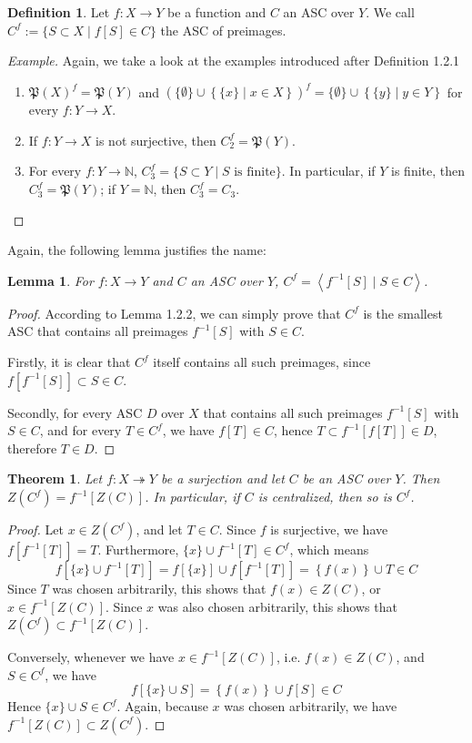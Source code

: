\documentclass{article}
\newtheorem{theorem}{Theorem}[subsection]
\newtheorem{lemma}{Lemma}[subsection]
\theoremstyle{remark}
\theoremstyle{definition}
\newtheorem{definition}{Definition}[subsection]
\newcommand{\N}{\mathbb N}
\newcommand{\p}{\mathfrak P}
\newenvironment{example}{\begin{proof}[Example]}{\end{proof}}
\begin{document}
	\begin{definition}
		Let $f:X\to Y$ be a function and $C$ an ASC over $Y$. We call $C^f:=\{S\subset X\mid f[S]\in C\}$ the ASC of preimages.
	\end{definition}
	\begin{example}
		Again, we take a look at the examples introduced after Definition 1.2.1
		\begin{enumerate}
			\item $\p(X)^f=\p(Y)$ and $\left(\{\emptyset\}\cup\left\{\{x\}\mid x\in X\right\}\right)^f=\{\emptyset\}\cup\left\{\{y\}\mid y\in Y\right\}$ for every $f:Y\to X$.
			\item If $f:Y\to X$ is not surjective, then $C_2^f=\p(Y)$.
			\item For every $f:Y\to\N$, $C_3^f=\{S\subset Y\mid S\text{ is finite}\}$. In particular, if $Y$ is finite, then $C_3^f=\p(Y)$; if $Y=\N$, then $C_3^f=C_3$.
		\end{enumerate}
	\end{example}
	Again, the following lemma justifies the name:
	\begin{lemma}
		For $f:X\to Y$ and $C$ an ASC over $Y$, $C^f=\left\langle f^{-1}[S]\mid S\in C\right\rangle$.
	\end{lemma}
	\begin{proof}
		According to Lemma 1.2.2, we can simply prove that $C^f$ is the smallest ASC that contains all preimages $f^{-1}[S]$ with $S\in C$.
		
		Firstly, it is clear that $C^f$ itself contains all such preimages, since $f\left[f^{-1}[S]\right]\subset S\in C$.
		
		Secondly, for every ASC $D$ over $X$ that contains all such preimages $f^{-1}[S]$ with $S\in C$, and for every $T\in C^f$, we have $f[T]\in C$, hence $T\subset f^{-1}\left[f[T]\right]\in D$, therefore $T\in D$.
	\end{proof}
	\begin{theorem}
		Let $f:X\twoheadrightarrow Y$ be a surjection and let $C$ be an ASC over $Y$. Then $Z\left(C^f\right)=f^{-1}\left[Z(C)\right]$. In particular, if $C$ is centralized, then so is $C^f$.
	\end{theorem}
	\begin{proof}
		Let $x\in Z\left(C^f\right)$, and let $T\in C$. Since $f$ is surjective, we have $f\left[f^{-1}[T]\right]=T$. Furthermore, $\{x\}\cup f^{-1}[T]\in C^f$, which means
		\[f\left[\{x\}\cup f^{-1}[T]\right]=f\left[\{x\}\right]\cup f\left[f^{-1}[T]\right]=\left\{f(x)\right\}\cup T\in C\]
		Since $T$ was chosen arbitrarily, this shows that $f(x)\in Z(C)$, or $x\in f^{-1}\left[Z(C)\right]$. Since $x$ was also chosen arbitrarily, this shows that $Z\left(C^f\right)\subset f^{-1}\left[Z(C)\right]$.
		
		Conversely, whenever we have $x\in f^{-1}\left[Z(C)\right]$, i.e. $f(x)\in Z(C)$, and $S\in C^f$, we have
		\[f\left[\{x\}\cup S\right]=\left\{f(x)\right\}\cup f[S]\in C\]
		Hence $\{x\}\cup S\in C^f$. Again, because $x$ was chosen arbitrarily, we have $f^{-1}\left[Z(C)\right]\subset Z\left(C^f\right)$.
	\end{proof}
\end{document}
